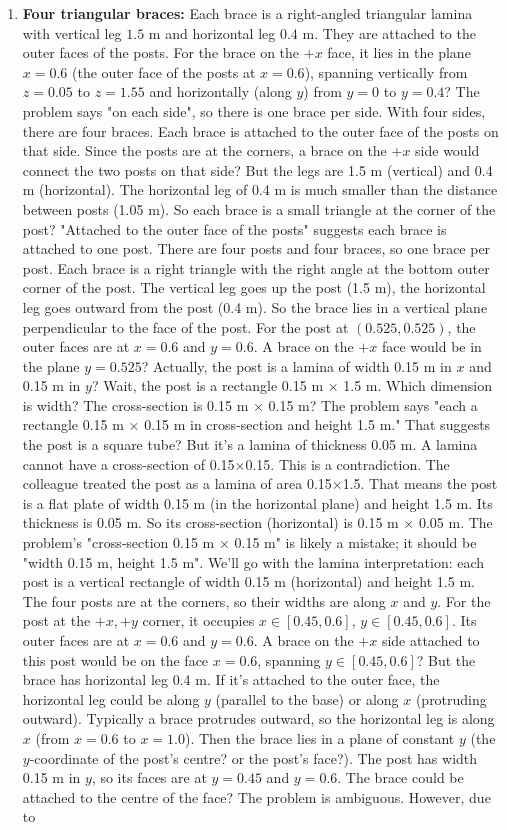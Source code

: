 \documentclass[11pt]{article}
\begin{document}
\begin{exoresolu}
\begin{enumerate}
    \item \textbf{Four triangular braces:} Each brace is a right‑angled triangular lamina with vertical leg $1.5$ m and horizontal leg $0.4$ m. They are attached to the outer faces of the posts. For the brace on the $+x$ face, it lies in the plane $x = 0.6$ (the outer face of the posts at $x=0.6$), spanning vertically from $z=0.05$ to $z=1.55$ and horizontally (along $y$) from $y=0$ to $y=0.4$? The problem says "on each side", so there is one brace per side. With four sides, there are four braces. Each brace is attached to the outer face of the posts on that side. Since the posts are at the corners, a brace on the $+x$ side would connect the two posts on that side? But the legs are 1.5 m (vertical) and 0.4 m (horizontal). The horizontal leg of 0.4 m is much smaller than the distance between posts (1.05 m). So each brace is a small triangle at the corner of the post? "Attached to the outer face of the posts" suggests each brace is attached to one post. There are four posts and four braces, so one brace per post. Each brace is a right triangle with the right angle at the bottom outer corner of the post. The vertical leg goes up the post (1.5 m), the horizontal leg goes outward from the post (0.4 m). So the brace lies in a vertical plane perpendicular to the face of the post. For the post at $(0.525,0.525)$, the outer faces are at $x=0.6$ and $y=0.6$. A brace on the $+x$ face would be in the plane $y=0.525$? Actually, the post is a lamina of width 0.15 m in $x$ and 0.15 m in $y$? Wait, the post is a rectangle 0.15 m × 1.5 m. Which dimension is width? The cross-section is 0.15 m × 0.15 m? The problem says "each a rectangle 0.15 m × 0.15 m in cross‑section and height 1.5 m." That suggests the post is a square tube? But it's a lamina of thickness 0.05 m. A lamina cannot have a cross-section of 0.15×0.15. This is a contradiction. The colleague treated the post as a lamina of area 0.15×1.5. That means the post is a flat plate of width 0.15 m (in the horizontal plane) and height 1.5 m. Its thickness is 0.05 m. So its cross-section (horizontal) is 0.15 m × 0.05 m. The problem's "cross‑section 0.15 m × 0.15 m" is likely a mistake; it should be "width 0.15 m, height 1.5 m". We'll go with the lamina interpretation: each post is a vertical rectangle of width 0.15 m (horizontal) and height 1.5 m. The four posts are at the corners, so their widths are along $x$ and $y$. For the post at the $+x,+y$ corner, it occupies $x \in [0.45,0.6]$, $y \in [0.45,0.6]$. Its outer faces are at $x=0.6$ and $y=0.6$. A brace on the $+x$ side attached to this post would be on the face $x=0.6$, spanning $y \in [0.45,0.6]$? But the brace has horizontal leg 0.4 m. If it's attached to the outer face, the horizontal leg could be along $y$ (parallel to the base) or along $x$ (protruding outward). Typically a brace protrudes outward, so the horizontal leg is along $x$ (from $x=0.6$ to $x=1.0$). Then the brace lies in a plane of constant $y$ (the $y$-coordinate of the post's centre? or the post's face?). The post has width 0.15 m in $y$, so its faces are at $y=0.45$ and $y=0.6$. The brace could be attached to the centre of the face? The problem is ambiguous. However, due to 
\end{enumerate}
\end{exoresolu}
\end{document}
